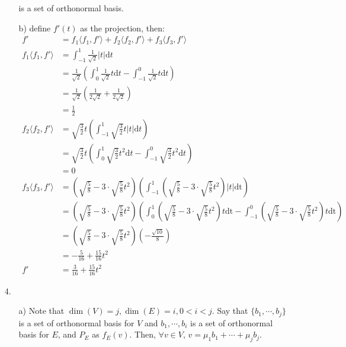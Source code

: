 \documentclass{article}
\begin{document}
\begin{itemize}
\begin{itemize}
                    is a set of orthonormal basis.
        \item [b)] define \(f'(t)\) as the projection, then:
        \begin{align*}
            f' &=f_1 \langle f_1,f'\rangle+f_2 \langle f_2,f'\rangle+f_3 \langle f_3,f'\rangle\\
            f_1 \langle f_1,f'\rangle&=\int_{-1}^{1}\frac{1}{\sqrt{2}}|t|\text{d}t\\
            &=\frac{1}{\sqrt{2}}\left(\int_{0}^{1}\frac{1}{\sqrt{2}}t\text{d}t-\int_{-1}^{0}\frac{1}{\sqrt{2}}t\text{d}t\right)\\
            &=\frac{1}{\sqrt{2}}\left(\frac{1}{2\sqrt{2}}+\frac{1}{2\sqrt{2}}\right)\\
            &=\frac{1}{2}\\
            f_2 \langle f_2,f'\rangle&=\sqrt{\frac{3}{2}}t\left(\int_{-1}^{1}\sqrt{\frac{3}{2}}t|t|\text{d}t\right)\\
            &=\sqrt{\frac{3}{2}}t\left(\int_{0}^{1}\sqrt{\frac{3}{2}}t^2\text{d}t-\int_{-1}^{0}\sqrt{\frac{3}{2}}t^2\text{d}t\right)\\
            &=0\\
            f_3 \langle f_3,f'\rangle&=\left(\sqrt{\frac{5}{8}}-3\cdot\sqrt{\frac{5}{8}}t^2\right)\left(\int_{-1}^{1}\left(\sqrt{\frac{5}{8}}-3\cdot\sqrt{\frac{5}{8}}t^2\right)|t|\text{dt}\right)\\
            &=\left(\sqrt{\frac{5}{8}}-3\cdot\sqrt{\frac{5}{8}}t^2\right)\left(\int_{0}^{1}\left(\sqrt{\frac{5}{8}}-3\cdot\sqrt{\frac{5}{8}}t^2\right)t\text{dt}-\int_{-1}^{0}\left(\sqrt{\frac{5}{8}}-3\cdot\sqrt{\frac{5}{8}}t^2\right)t\text{dt}\right)\\
            &=\left(\sqrt{\frac{5}{8}}-3\cdot\sqrt{\frac{5}{8}}t^2\right)\left(-\frac{\sqrt{10}}{8}\right)\\
            &=-\frac{5}{16}+\frac{15}{16}t^2\\
            f'&=\frac{3}{16}+\frac{15}{16}t^2
        \end{align*}
    \end{itemize}
    \item [4.]
    \begin{itemize}
        \item [a)] Note that \(\dim(V)=j,\dim(E)=i,0<i<j\). Say that \(\{b_1,\cdots,b_j\}\) is a set of orthonormal basis for \(V\) and \(b_1,\cdots,b_i\) is a set of orthonormal basis for \(E\), and \(P_E\) as \(f_E(v)\). Then, \(\forall v \in V\), \(v=\mu_1b_1+\cdots+\mu_jb_j\). 

\end{itemize}
\end{itemize}
\end{document}
